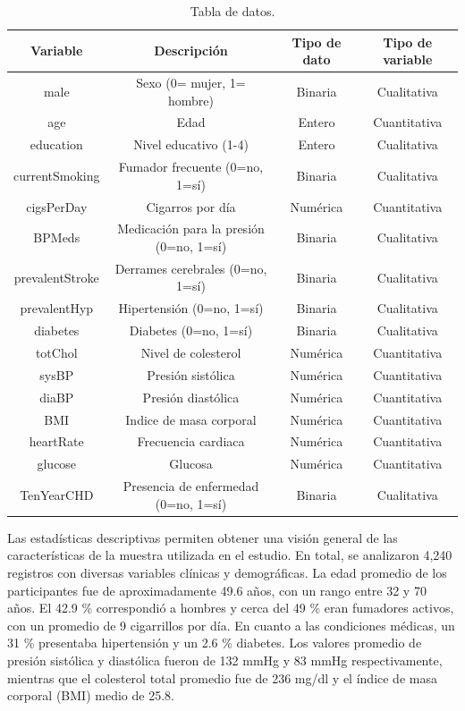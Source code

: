 \documentclass{article}
\begin{document}
    \begin{table}[h]
        \centering
        \begin{tabular}{|c|c|c|c|}
            \hline
            \textbf{Variable} & \textbf{Descripción} & \textbf{Tipo de dato} & \textbf{Tipo de variable} \\ \hline
            male & Sexo (0= mujer, 1= hombre) & Binaria  & Cualitativa\\ \hline
            age & Edad & Entero & Cuantitativa \\ \hline
            education &  Nivel educativo (1-4) & Entero & Cualitativa \\ \hline
            currentSmoking & Fumador frecuente (0=no, 1=sí) & Binaria  & Cualitativa \\ \hline
            cigsPerDay & Cigarros por día  & Numérica & Cuantitativa \\ \hline
            BPMeds & Medicación para la presión (0=no, 1=sí) & Binaria & Cualitativa \\ \hline
            prevalentStroke & Derrames cerebrales (0=no, 1=sí) & Binaria & Cualitativa \\ \hline
            prevalentHyp & Hipertensión (0=no, 1=sí) & Binaria & Cualitativa \\ \hline
            diabetes & Diabetes (0=no, 1=sí)  & Binaria & Cualitativa \\ \hline
            totChol & Nivel de colesterol & Numérica & Cuantitativa \\ \hline
            sysBP & Presión sistólica  & Numérica & Cuantitativa \\ \hline
            diaBP & Presión diastólica  & Numérica & Cuantitativa \\ \hline
            BMI & Indice de masa corporal & Numérica & Cuantitativa \\ \hline
            heartRate & Frecuencia cardiaca & Numérica & Cuantitativa \\ \hline
            glucose & Glucosa & Numérica & Cuantitativa \\ 
            \hline
            TenYearCHD & Presencia de enfermedad (0=no, 1=sí) & Binaria & Cualitativa\\ \hline
        \end{tabular}
        \caption{Tabla de datos.}
        \label{tab:mi_tabla}
    \end{table}

    Las estadísticas descriptivas permiten obtener una visión general de las características de la muestra utilizada en el estudio. En total, se analizaron 4,240 registros con diversas variables clínicas y demográficas. La edad promedio de los participantes fue de aproximadamente 49.6 años, con un rango entre 32 y 70 años. El 42.9 \% correspondió a hombres y cerca del 49 \% eran fumadores activos, con un promedio de 9 cigarrillos por día. En cuanto a las condiciones médicas, un 31 \% presentaba hipertensión y un 2.6 \% diabetes. Los valores promedio de presión sistólica y diastólica fueron de 132 mmHg y 83 mmHg respectivamente, mientras que el colesterol total promedio fue de 236 mg/dl y el índice de masa corporal (BMI) medio de 25.8.
\end{document}

